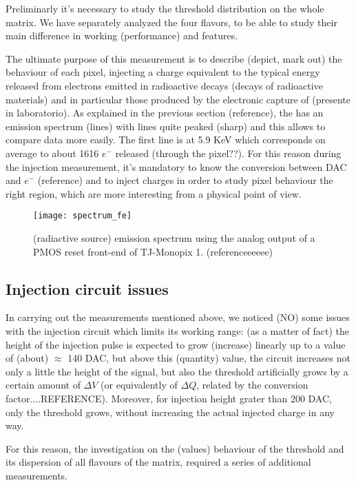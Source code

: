 Preliminarly it's necessary to study the threshold distribution on the whole matrix. We have separately analyzed the four flavors, to be able to study their main difference in working (performance) and features.

The ultimate purpose of this measurement is to describe (depict, mark out) the behaviour of each pixel, injecting a charge equivalent to the typical energy released from electrons emitted in radioactive decays (decays of radioactive materials) and in particular those produced by the electronic capture of  (presente in laboratorio). As explained in the previous section (reference), the  has an emission spectrum (lines) with lines quite peaked (sharp) and this allows to compare data more easily. The first line is at 5.9 KeV which corresponds on average to about 1616 $e^{-}$ released (through the pixel??).
For this reason during the injection measurement, it's mandatory to know the conversion between DAC and $e^{-}$ (reference) and to inject charges in order to study pixel behaviour  the right region, which are more interesting from a physical point of view.

\begin{figure}[h!]
\centering
\texttt{[image: spectrum\_fe]}
\caption{ (radiactive source) emission spectrum using the analog output of a PMOS reset front-end of TJ-Monopix 1. (referenceeeeee)}
\label{fig:fespectrum}
\end{figure}

\subsection{Injection circuit issues}

In carrying out the measurements mentioned above, we noticed (NO) some issues with the injection circuit which limits its working range: (as a matter of fact) the height of the injection pulse is expected to grow (increase) linearly up to a value of (about) $\approx$ 140 DAC, but  above this (quantity) value, the circuit increases not only a little the height of the signal, but also the threshold artificially grows by a certain amount of $\Delta V$ (or equivalently of $\Delta Q$, related by the conversion factor....REFERENCE).
Moreover, for injection height grater than 200 DAC, only the threshold grows, without increasing the actual injected charge in any way.

For this reason, the investigation on the (values) behaviour of the threshold and its dispersion of all flavours of the matrix, required a series of additional measurements.

